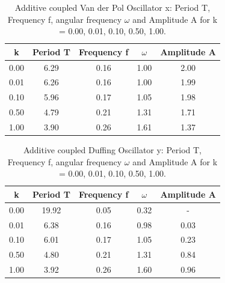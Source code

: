 \documentclass[oneside,10pt,a4paper]{report}
\begin{document}
		\begin{table}[H]
			\centering
			\caption{Additive coupled Van der Pol Oscillator x: Period T, Frequency f, angular frequency $\omega$ and Amplitude A for k = 0.00, 0.01, 0.10, 0.50, 1.00.}
			\label{tab: freq_x}
			\begin{tabular}{c c c c c}
				\toprule
				k & Period T & Frequency f & $\omega$ & Amplitude A \\
				\midrule
				0.00 & 6.29 & 0.16 & 1.00 & 2.00 \\
				0.01 & 6.26 & 0.16 & 1.00 & 1.99 \\
				0.10 & 5.96 & 0.17 & 1.05 & 1.98 \\
				0.50 & 4.79 & 0.21 & 1.31 & 1.71 \\
				1.00 & 3.90 & 0.26 & 1.61 & 1.37 \\
				\bottomrule
			\end{tabular}
		\end{table}
		\begin{table}[H]
			\centering
			\caption{Additive coupled Duffing Oscillator y: Period T, Frequency f, angular frequency $\omega$ and Amplitude A for k = 0.00, 0.01, 0.10, 0.50, 1.00.}
			\label{tab: freq_y}
			\begin{tabular}{c c c c c}
				\toprule
				k & Period T & Frequency f & $\omega$ & Amplitude A \\
				\midrule
				0.00 &19.92 & 0.05 & 0.32 & - \\
				0.01 & 6.38 & 0.16 & 0.98 & 0.03 \\
				0.10 & 6.01 & 0.17 & 1.05 & 0.23 \\
				0.50 & 4.80 & 0.21 & 1.31 & 0.84 \\
				1.00 & 3.92 & 0.26 & 1.60 & 0.96 \\
				\bottomrule
			\end{tabular}
		\end{table}
		
\end{document}
